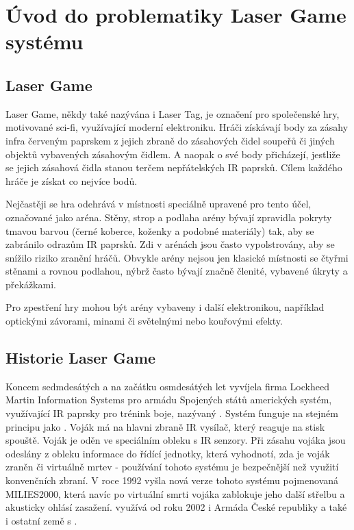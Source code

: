 \chapter{Úvod do problematiky Laser Game systému}

\section{Laser Game}
Laser Game, někdy také nazývána i Laser Tag, je označení pro společenské hry, motivované sci-fi, využívající moderní elektroniku. Hráči získávají body za zásahy infra červeným paprskem z jejich zbraně do zásahových čidel soupeřů či jiných objektů vybavených zásahovým čidlem. A naopak o své body přicházejí, jestliže se jejich zásahová čidla stanou terčem nepřátelských IR paprsků. Cílem každého hráče je získat co nejvíce bodů.

Nejčastěji se hra odehrává v místnosti speciálně upravené pro tento účel, označované jako aréna. Stěny, strop a podlaha arény bývají zpravidla pokryty tmavou barvou (černé koberce, koženky a podobné materiály) tak, aby se zabránilo odrazům IR paprsků. Zdi v arénách jsou často vypolstrovány, aby se snížilo riziko zranění hráčů. Obvykle arény nejsou jen klasické místnosti se čtyřmi stěnami a rovnou podlahou, nýbrž často bývají značně členité, vybavené úkryty a překážkami.

Pro zpestření hry mohou být arény vybaveny i další elektronikou, například optickými závorami, minami či světelnými nebo kouřovými efekty.

\section{Historie Laser Game}
Koncem sedmdesátých a na začátku osmdesátých let vyvíjela firma Lockheed Martin Information Systems pro armádu Spojených států amerických systém, využívající IR paprsky pro trénink boje, nazývaný . Systém funguje na stejném principu jako . Voják má na hlavni zbraně IR vysílač, který reaguje na stisk spouště. Voják je oděn ve speciálním obleku s IR senzory. Při zásahu vojáka jsou odeslány z obleku informace do řídící jednotky, která vyhodnotí, zda je voják zraněn či virtuálně mrtev - používání tohoto systému je bezpečnější než využití konvenčních zbraní. V roce 1992 vyšla nová verze tohoto systému pojmenovaná MILIES2000, která navíc po virtuální smrti vojáka zablokuje jeho další střelbu a akusticky ohlásí zasažení.  využívá od roku 2002 i Armáda České republiky a také i ostatní země s .

